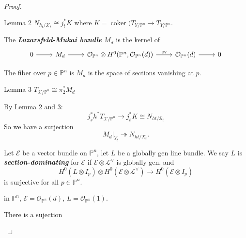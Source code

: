 \begin{proof}
\begin{thing4}{Lemma 2}\leavevmode
	$N_{h_t/\mathcal{X}_t}\cong j^*_t K$ where $K=\operatorname{coker}(T_{Y/\mathbb{P}^n}\to T_{Y/\mathbb{P}^n}$.
\end{thing4}

\begin{defn}\leavevmode
	The \textit{\textbf{Lazarsfeld-Mukai bundle}} $M_d$ is the kernel of
	\[\begin{tikzcd}0\arrow[r]&M_d\arrow[r]&\mathcal{O}_{\mathbb{P}^n}\otimes H^{0}(\mathbb{P}^n , \mathcal{O}_{\mathbb{P}^n}(d))\arrow[r,"\operatorname{ev}"]&\mathcal{O}_{\mathbb{P}^n}(d)\arrow[r]&0\end{tikzcd}\]
\end{defn}

\begin{remark}\leavevmode
	The fiber over $p \in \mathbb{P}^n$ is $M_d$ is the space of sections vanishing at $p$.
\end{remark}

\begin{thing4}{Lemma 3}\leavevmode
	$T_{\mathcal{X}/\mathbb{P}^n}\cong \pi ^*_2M_d$
\end{thing4}

By Lemma 2 and 3:
\[j^*_sh^*  T_{\mathcal{X}/\mathbb{P}^n}\longrightarrow j^* _t K\cong N_{ht/\mathfrak{X}_t}\]
So we have a surjection
\[M_d|_{Y_t}\twoheadrightarrow N_{ht/X_t}.\]

\begin{defn}\leavevmode
	Let $\mathcal{E}$ be a vector bundle on $\mathbb{P}^n$, let $L$ be a globally gen line bundle. We say $L$ is \textit{\textbf{section-dominating}} for $\mathcal{E}$ if $\mathcal{E} \otimes \mathcal{L}^\vee$ is globally gen. and
	\[H^{0}(L \otimes I_p)\otimes H^{0}(\mathcal{E} \otimes \mathcal{L}^\vee)\longrightarrow H^{0}(\mathcal{E} \otimes I_p)\]
	is surjective for all $p \in \mathbb{P}^n$.
\end{defn}

\begin{example}\leavevmode
	in $\mathbb{P}^n$, $\mathcal{E}=\mathcal{O}_{\mathbb{P}^n}(d)$, $L=\mathcal{O}_{\mathbb{P}^n}(1)$.
\end{example}

\begin{prop}\leavevmode
	There is a sujection 
\end{prop}







\end{proof}



